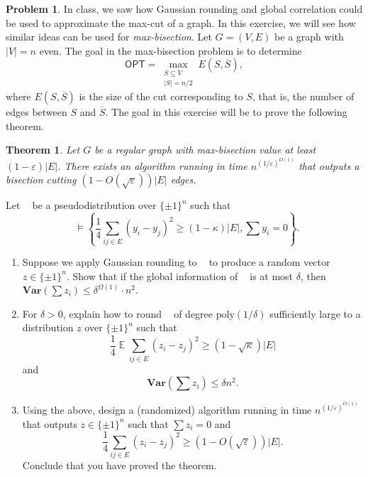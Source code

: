 \documentclass[11pt]{article}
\newtheorem*{theorem*}{Theorem}
\theoremstyle{definition}
\newtheorem{problem}[theorem]{Problem}
\newcommand{\poly}{\mathrm{poly}}
\renewcommand{\epsilon}{\varepsilon}
\newcommand{\eps}{\epsilon}
\DeclareMathOperator{\E}{\mathbb{E}} %
\DeclareMathOperator{\pE}{\widetilde{\mathbb{E}}} %
\newcommand{\Var}{\mathbf{Var}}
\newcommand{\OPT}{\mathsf{OPT}}
\begin{document}
\begin{problem}
  In class, we saw how Gaussian rounding and global correlation could be used to approximate the max-cut of a graph. In this exercise, we will see how similar ideas can be used for \emph{max-bisection}. Let $G = (V,E)$ be a graph with $|V|=n$ even. The goal in the max-bisection problem is to determine
  \[ \OPT = \max_{\substack{S \subseteq V \\ |S| = n/2}} E(S,\overline{S}), \]
  where $E(S,\overline{S})$ is the size of the cut corresponding to $S$, that is, the number of edges between $S$ and $\overline{S}$. The goal in this exercise will be to prove the following theorem.

  \begin{theorem*}
    Let $G$ be a regular graph with max-bisection value at least $(1-\eps) |E|$. There exists an algorithm running in time $n^{(1/\eps)^{O(1)}}$ that outputs a bisection cutting $(1-O(\sqrt{\eps})) |E|$ edges.
  \end{theorem*}

  Let $\pE$ be a pseudodistribution over $\{\pm 1\}^n$ such that
  \[ \pE \vDash \left\{ \frac{1}{4} \sum_{ij \in E} (y_i-y_j)^2 \ge (1 - \kappa) |E| , \sum y_i = 0 \right\}. \]

  \begin{enumerate}
    \item Suppose we apply Gaussian rounding to $\pE$ to produce a random vector $z \in \{\pm 1\}^n$. Show that if the global information of $\pE$ is at most $\delta$, then $\Var \left(\sum z_i\right) \le \delta^{\Omega(1)} \cdot n^2$.

    \item For $\delta > 0$, explain how to round $\pE$ of degree $\poly(1/\delta)$ sufficiently large to a distribution $z$ over $\{\pm 1\}^n$ such that
    \[ \frac{1}{4} \E \sum_{ij \in E} (z_i - z_j)^2 \ge (1 - \sqrt{\kappa})|E| \]
    and
    \[ \Var \left( \sum z_i \right) \le \delta n^2. \]

    \item Using the above, design a (randomized) algorithm running in time $n^{(1/\eps)^{O(1)}}$ that outputs $z \in \{\pm 1\}^n$ such that $\sum z_i = 0$ and
    \[ \frac{1}{4} \sum_{ij \in E} (z_i - z_j)^2 \ge (1-O(\sqrt{\eps})) |E|. \]
    Conclude that you have proved the theorem.
  \end{enumerate}
\end{problem}
\end{document}
